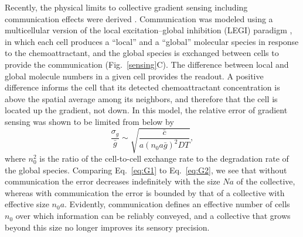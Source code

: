 Recently, the physical limits to collective gradient sensing including communication effects were derived \cite{ellison2016cell, mugler2016limits}. Communication was modeled using a multicellular version of the local excitation--global inhibition (LEGI) paradigm \cite{levchenko2002models}, in which each cell produces a ``local'' and a ``global'' molecular species in response to the chemoattractant, and the global species is exchanged between cells to provide the communication (Fig.\ \ref{sensing}C). The difference between local and global molecule numbers in a given cell provides the readout. A positive difference informs the cell that its detected chemoattractant concentration is above the spatial average among its neighbors, and therefore that the cell is located up the gradient, not down.
In this model, the relative error of gradient sensing was shown \cite{mugler2016limits} to be limited from below by
\begin{equation}
\label{eq:G2}
\frac{\sigma_g}{\bar{g}} \sim \sqrt{\frac{\bar{c}}{a(n_0a\bar{g})^2DT}},
\end{equation}
where $n_0^2$ is the ratio of the cell-to-cell exchange rate to the degradation rate of the global species. Comparing Eq.\ \ref{eq:G1} to Eq.\ \ref{eq:G2}, we see that without communication the error decreases indefinitely with the size $Na$ of the collective, whereas with communication the error is bounded by that of a collective with effective size $n_0a$. Evidently, communication defines an effective number of cells $n_0$ over which information can be reliably conveyed, and a collective that grows beyond this size no longer improves its sensory precision.

